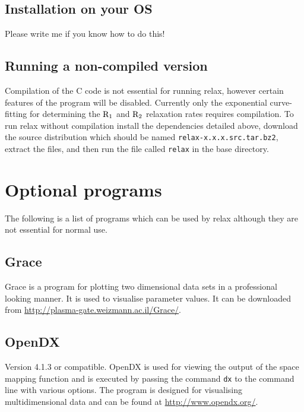 \subsection{Installation on your OS}

Please write me if you know how to do this!



\subsection{Running a non-compiled version}

Compilation of the C code is not essential for running relax, however certain features of the program will be disabled.  Currently only the exponential curve-fitting for determining the $\mathrm{R}_1$ and $\mathrm{R}_2$ relaxation rates requires compilation.  To run relax without compilation install the dependencies detailed above, download the source distribution which should be named \texttt{relax-x.x.x.src.tar.bz2}, extract the files, and then run the file called \texttt{relax} in the base directory.




\section{Optional programs}

The following is a list of programs which can be used by relax although they are not essential for normal use.


\subsection{Grace}

Grace is a program for plotting two dimensional data sets in a professional looking manner.  It is used to visualise parameter values.  It can be downloaded from \href{http://plasma-gate.weizmann.ac.il/Grace/}{http://plasma-gate.weizmann.ac.il/Grace/}.


\subsection{OpenDX}

Version 4.1.3 or compatible.  OpenDX is used for viewing the output of the space mapping function and is executed by passing the command \texttt{dx} to the command line with various options.  The program is designed for visualising multidimensional data and can be found at \href{http://www.opendx.org/}{http://www.opendx.org/}.


